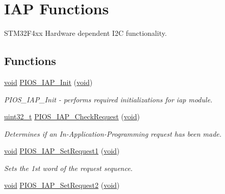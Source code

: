 \hypertarget{group___p_i_o_s___i_a_p}{\section{I\-A\-P Functions}
\label{group___p_i_o_s___i_a_p}
}


S\-T\-M32\-F4xx Hardware dependent I2\-C functionality.  


\subsection*{Functions}
\begin{DoxyCompactItemize}
\item 
\hyperlink{group___n_a_m_e_ga18028b8badbf1ea7e704ccac3c488e82}{void} \hyperlink{group___p_i_o_s___i_a_p_ga934ab6403364f7db094874c8b22ac39b}{P\-I\-O\-S\-\_\-\-I\-A\-P\-\_\-\-Init} (\hyperlink{group___n_a_m_e_ga18028b8badbf1ea7e704ccac3c488e82}{void})
\begin{DoxyCompactList}\small\item\em P\-I\-O\-S\-\_\-\-I\-A\-P\-\_\-\-Init -\/ performs required initializations for iap module. \end{DoxyCompactList}\item 
\hyperlink{stdint_8h_a435d1572bf3f880d55459d9805097f62}{uint32\-\_\-t} \hyperlink{group___p_i_o_s___i_a_p_ga727e2ab4e4516e678c92361691368cde}{P\-I\-O\-S\-\_\-\-I\-A\-P\-\_\-\-Check\-Request} (\hyperlink{group___n_a_m_e_ga18028b8badbf1ea7e704ccac3c488e82}{void})
\begin{DoxyCompactList}\small\item\em Determines if an In-\/\-Application-\/\-Programming request has been made. \end{DoxyCompactList}\item 
\hyperlink{group___n_a_m_e_ga18028b8badbf1ea7e704ccac3c488e82}{void} \hyperlink{group___p_i_o_s___i_a_p_ga61d5d14426b73d8107cbed60770fcb60}{P\-I\-O\-S\-\_\-\-I\-A\-P\-\_\-\-Set\-Request1} (\hyperlink{group___n_a_m_e_ga18028b8badbf1ea7e704ccac3c488e82}{void})
\begin{DoxyCompactList}\small\item\em Sets the 1st word of the request sequence. \end{DoxyCompactList}\item 
\hyperlink{group___n_a_m_e_ga18028b8badbf1ea7e704ccac3c488e82}{void} \hyperlink{group___p_i_o_s___i_a_p_ga479699ab37d0c0277f93ac0b999d535c}{P\-I\-O\-S\-\_\-\-I\-A\-P\-\_\-\-Set\-Request2} (\hyperlink{group___n_a_m_e_ga18028b8badbf1ea7e704ccac3c488e82}{void})

\end{DoxyCompactItemize}
